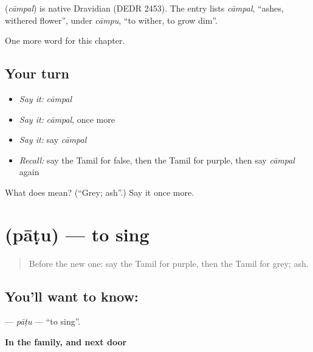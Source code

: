 \begin{cousinweb}
\textbf{} (\emph{cāmpal}) is native Dravidian (DEDR 2453). The entry lists \emph{cāmpal}, \textquotedblleft{}ashes, withered flower\textquotedblright{}, under \emph{cāmpu}, \textquotedblleft{}to wither, to grow dim\textquotedblright{}.
\end{cousinweb}

\begin{grammarlens}[title={What you've built}]
One more word for this chapter.
\end{grammarlens}

\subsection*{Your turn}
\begin{itemize}
\raggedright
  \item \emph{Say it:} \emph{cāmpal}
  \item \emph{Say it:} \emph{cāmpal}, once more
  \item \emph{Say it:} say \emph{cāmpal}
  \item \emph{Recall:} say the Tamil for false, then the Tamil for purple, then say \emph{cāmpal} again
\end{itemize}

\begin{tcolorbox}[breakable,colback=teal!4,colframe=teal!35!black,title={Before you move on}]
What does  mean? (\textquotedblleft{}Grey; ash\textquotedblright{}.) Say it once more.
\end{tcolorbox}
\section[\texorpdfstring{\ta{பாடு} (pāṭu)}{பாடு (pāṭu)}]{ (pāṭu) — to sing}

\label{lesson:TA-C150-patu}



\begin{quote}
Before the new one: say the Tamil for purple, then the Tamil for grey; ash.
\end{quote}

\subsection*{You'll want to know: }
\textbf{} — \emph{pāṭu} — \textquotedblleft{}to sing\textquotedblright{}.

\textbf{In the family, and next door}

